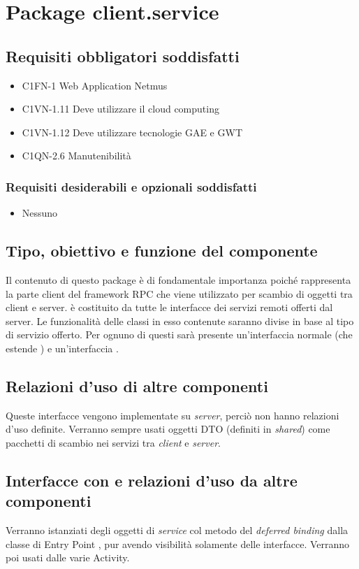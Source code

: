 \newpage
\section{Package client.service} %
\subsection*{Requisiti obbligatori soddisfatti}
\begin{itemize}
    \item C1FN-1 Web Application Netmus
    \item C1VN-1.11 Deve utilizzare il cloud computing
    \item C1VN-1.12 Deve utilizzare tecnologie GAE e GWT
    \item C1QN-2.6 Manutenibilit\`a
\end{itemize}
\subsubsection*{Requisiti desiderabili e opzionali soddisfatti}
\begin{itemize}
    \item Nessuno
\end{itemize}
\subsection*{Tipo, obiettivo e funzione del componente}
Il contenuto di questo package \`e di fondamentale importanza poich\'e
rappresenta la parte client del framework RPC che viene utilizzato per scambio
di oggetti tra client e server.  \`e costituito da tutte
le interfacce dei servizi remoti offerti dal server. Le funzionalit\`a delle
classi in esso contenute saranno divise in base al tipo di servizio offerto. Per
ognuno di questi sar\`a presente un'interfaccia normale (che estende
) e un'interfaccia .
\subsection*{Relazioni d'uso di altre componenti}
Queste interfacce vengono implementate su \emph{server}, perci\`o non
hanno relazioni d'uso definite. Verranno sempre usati oggetti DTO (definiti in
\emph{shared}) come pacchetti di scambio nei servizi tra \emph{client} e
\emph{server}.
\subsection*{Interfacce con e relazioni d'uso da altre componenti}
Verranno istanziati degli oggetti di \emph{service} col metodo del
\emph{deferred binding} dalla classe di Entry Point , pur avendo
visibilit\`a solamente delle interfacce. Verranno poi usati dalle varie Activity.
